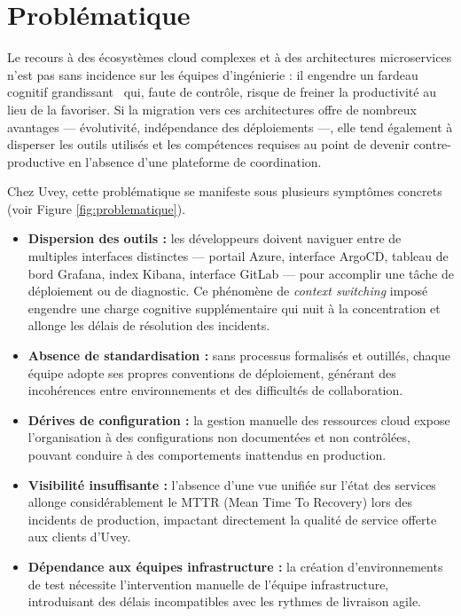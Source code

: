 \section{Problématique}
\label{sec:problematique}

Le recours à des écosystèmes cloud complexes et à des architectures microservices n'est pas sans incidence sur les équipes d'ingénierie : il engendre un fardeau cognitif grandissant~\cite{forsgren2018accelerate} qui, faute de contrôle, risque de freiner la productivité au lieu de la favoriser. Si la migration vers ces architectures offre de nombreux avantages --- évolutivité, indépendance des déploiements ---, elle tend également à disperser les outils utilisés et les compétences requises au point de devenir contre-productive en l'absence d'une plateforme de coordination.

Chez Uvey, cette problématique se manifeste sous plusieurs symptômes concrets (voir Figure \ref{fig:problematique}).

\begin{itemize}[itemsep=0.2cm, topsep=0.3cm]
  \item \textbf{Dispersion des outils :} les développeurs doivent naviguer entre de multiples interfaces distinctes --- portail Azure, interface ArgoCD, tableau de bord Grafana, index Kibana, interface GitLab --- pour accomplir une tâche de déploiement ou de diagnostic. Ce phénomène de \textit{context switching} imposé engendre une charge cognitive supplémentaire qui nuit à la concentration et allonge les délais de résolution des incidents.
  \item \textbf{Absence de standardisation :} sans processus formalisés et outillés, chaque équipe adopte ses propres conventions de déploiement, générant des incohérences entre environnements et des difficultés de collaboration.
  \item \textbf{Dérives de configuration :} la gestion manuelle des ressources cloud expose l'organisation à des configurations non documentées et non contrôlées, pouvant conduire à des comportements inattendus en production.
  \item \textbf{Visibilité insuffisante :} l'absence d'une vue unifiée sur l'état des services allonge considérablement le MTTR (Mean Time To Recovery) lors des incidents de production, impactant directement la qualité de service offerte aux clients d'Uvey.
  \item \textbf{Dépendance aux équipes infrastructure :} la création d'environnements de test nécessite l'intervention manuelle de l'équipe infrastructure, introduisant des délais incompatibles avec les rythmes de livraison agile.
\end{itemize}

